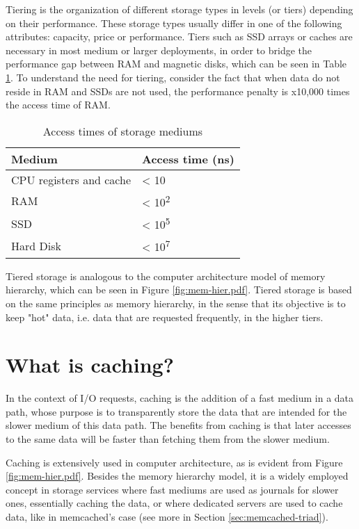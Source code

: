 Tiering is the organization of different storage types in levels (or tiers) 
depending on their performance.  These storage types usually differ in one of 
the following attributes: capacity, price or performance.  Tiers such as SSD 
arrays or caches are necessary in most medium or larger deployments, in order 
to bridge the performance gap between RAM and magnetic disks, which can be seen 
in Table \ref{tab:gap}. To understand the need for tiering, consider the fact 
that when data do not reside in RAM and SSDs are not used, the performance 
penalty is x10,000 times the access time of RAM.

\begin{table}
	\centering
	\begin{tabular}{ | l | l | }
		\hline
		Medium & Access time (ns) \\ \hline \hline
		CPU registers and cache & < 10 \\ \hline
		RAM & < 10\textsuperscript{2}  \\ \hline
		SSD & < 10\textsuperscript{5} \\ \hline
		Hard Disk & < 10\textsuperscript{7} \\ \hline
	\end{tabular}
	\caption{Access times of storage mediums}
	\label{tab:gap}
\end{table}

Tiered storage is analogous to the computer architecture model of memory 
hierarchy, which can be seen in Figure \ref{fig:mem-hier.pdf}. Tiered storage 
is based on the same principles as memory hierarchy, in the sense that its 
objective is to keep "hot" data, i.e. data that are requested frequently, in 
the higher tiers.


\section{What is caching?}

In the context of I/O requests, caching is the addition of a fast medium in a 
data path, whose purpose is to transparently store the data that are intended 
for the slower medium of this data path. The benefits from caching is that 
later accesses to the same data will be faster than fetching them from the 
slower medium.

Caching is extensively used in computer architecture, as is evident from Figure 
\ref{fig:mem-hier.pdf}. Besides the memory hierarchy model, it is a widely 
employed concept in storage services where fast mediums are used as journals 
for slower ones, essentially caching the data, or where dedicated servers are 
used to cache data, like in memcached's case (see more in Section 
\ref{sec:memcached-triad}).

